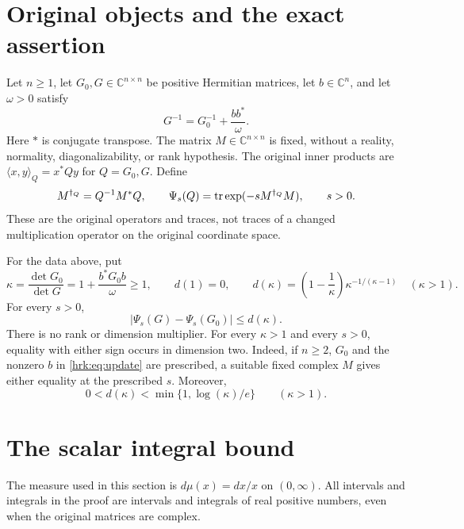\section{Original objects and the exact assertion}
Let $n\geq1$, let $G_0,G\in\mathbb C^{n\times n}$ be positive
Hermitian matrices, let $b\in\mathbb C^n$, and let $\omega>0$ satisfy
\begin{equation}\label{hrk:eq:update}
 G^{-1}=G_0^{-1}+\frac{bb^*}{\omega}.
\end{equation}
Here $*$ is conjugate transpose. The matrix $M\in\mathbb C^{n\times n}$
is fixed, without a reality, normality, diagonalizability, or rank
hypothesis. The original inner products are
$\langle x,y\rangle_Q=x^*Qy$ for $Q=G_0,G$. Define
\begin{equation}\label{hrk:eq:original-observable}
 M^{\dagger_Q}=Q^{-1}M^*Q,\qquad
 \Psi_s(Q)=\operatorname{tr}\exp(-sM^{\dagger_Q}M),\qquad s>0.
\end{equation}
These are the original operators and traces, not traces of a changed
multiplication operator on the original coordinate space.

\begin{hrktheorem}\label{hrk:thm:main}
For the data above, put
\begin{equation}\label{hrk:eq:kappa}
 \kappa=\frac{\det G_0}{\det G}
       =1+\frac{b^*G_0b}{\omega}\geq1,
 \qquad
 d(1)=0,\qquad
 d(\kappa)=\left(1-\frac1\kappa\right)
                    \kappa^{-1/(\kappa-1)}\quad(\kappa>1).
\end{equation}
For every $s>0$,
\begin{equation}\label{hrk:eq:sharp-bound}
 \left|\Psi_s(G)-\Psi_s(G_0)\right|\leq d(\kappa).
\end{equation}
There is no rank or dimension multiplier. For every $\kappa>1$ and
every $s>0$, equality with either sign occurs in dimension two.
Indeed, if $n\geq2$, $G_0$ and the nonzero $b$ in
\eqref{hrk:eq:update} are prescribed, a suitable fixed complex $M$ gives
either equality at the prescribed $s$. Moreover,
\begin{equation}\label{hrk:eq:strict-improvement}
 0<d(\kappa)<\min\{1,\log(\kappa)/e\}\qquad(\kappa>1).
\end{equation}
\end{hrktheorem}

\section{The scalar integral bound}
The measure used in this section is $d\mu(x)=dx/x$ on $(0,\infty)$.
All intervals and integrals in the proof are intervals and integrals of
real positive numbers, even when the original matrices are complex.

